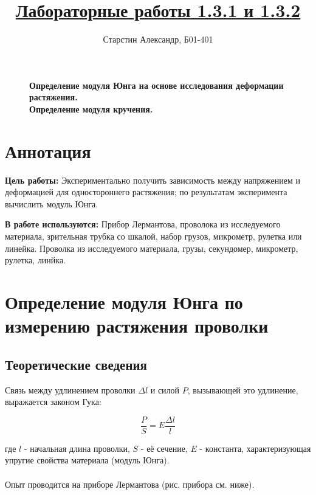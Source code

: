 \documentclass[a4paper]{article}
\title{\underline{Лабораторные работы 1.3.1 и 1.3.2}}
\author{Старстин Александр, Б01-401}
\begin{document}
\maketitle
\newpage
\begin{figure}[!ht]
\newpage
    \centering
    \textbf{Определение модуля Юнга на основе исследования деформации растяжения.}\\
    \textbf{Определение модуля кручения.}
\end{figure}

\section{Аннотация}
    \par \textbf{Цель работы:} Экспериментально получить зависимость между напряжением и деформацией для одностороннего растяжения; по результатам эксперимента вычислить модуль Юнга. \\

    \par \textbf{В работе используются:} Прибор Лермантова, проволока из исследуемого материала, зрительная трубка со шкалой, набор грузов, микрометр, рулетка или линейка. Проволка из исследуемого материала,
грузы, секундомер, микрометр, рулетка, линйка.

\section{Определение модуля Юнга по измерению растяжения проволки}

\subsection{Теоретические сведения}

Связь между удлинением проволки $\Delta l$ и силой $P$, вызывающей это удлинение, выражается законом Гука:

\begin{equation}\label{lermantov}
    \frac{P}{S}=E\frac{\Delta l}{l}
\end{equation}

где $l$ - начальная длина проволки, $S$ - её сечение, $E$ - константа, характеризующая упругие свойства материала (модуль Юнга).\\\\

Опыт проводится на приборе Лермантова (рис. прибора см. ниже).
\end{document}
